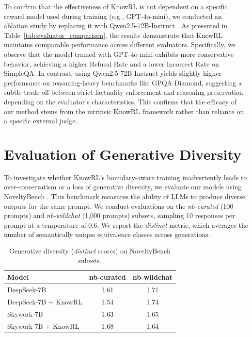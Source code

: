 To confirm that the effectiveness of KnowRL is not dependent on a specific reward model used during training (e.g., GPT-4o-mini), we conducted an ablation study by replacing it with Qwen2.5-72B-Instruct \citep{qwen2.5}. 
As presented in Table~\ref{tab:evaluator_comparison}, the results demonstrate that KnowRL maintains comparable performance across different evaluators. 
Specifically, we observe that the model trained with GPT-4o-mini exhibits more conservative behavior, achieving a higher Refusal Rate and a lower Incorrect Rate on SimpleQA. In contrast, using Qwen2.5-72B-Instruct yields slightly higher performance on reasoning-heavy benchmarks like GPQA Diamond, suggesting a subtle trade-off between strict factuality enforcement and reasoning preservation depending on the evaluator's characteristics. 
This confirms that the efficacy of our method stems from the intrinsic KnowRL framework rather than reliance on a specific external judge.





\section{Evaluation of Generative Diversity}
\label{app:generative_diversity}

To investigate whether KnowRL's boundary-aware training inadvertently leads to over-conservatism or a loss of generative diversity, we evaluate our models using NoveltyBench \cite{zhang2025noveltybench}. This benchmark measures the ability of LLMs to produce diverse outputs for the same prompt. We conduct evaluations on the \textit{nb-curated} (100 prompts) and \textit{nb-wildchat} (1,000 prompts) subsets, sampling 10 responses per prompt at a temperature of 0.6. We report the \textit{distinct} metric, which averages the number of semantically unique equivalence classes across generations.

\begin{table}[h]
    \centering
    \small
    \setlength{\tabcolsep}{5.5pt} 
    \renewcommand{\arraystretch}{0.9} 
    \begin{tabular}{lcc}
    \toprule
    \textbf{Model} & \textbf{nb-curated} & \textbf{nb-wildchat} \\
    \midrule
    DeepSeek-7B & 1.61 & 1.71 \\
    DeepSeek-7B + KnowRL & 1.54 & 1.74 \\
    \midrule
    Skywork-7B & 1.63 & 1.65 \\
    Skywork-7B + KnowRL & 1.68 & 1.64 \\
    \bottomrule
    \end{tabular}
    \caption{Generative diversity (\textit{distinct} scores) on NoveltyBench subsets.}
    \label{tab:noveltybench}
\end{table}

